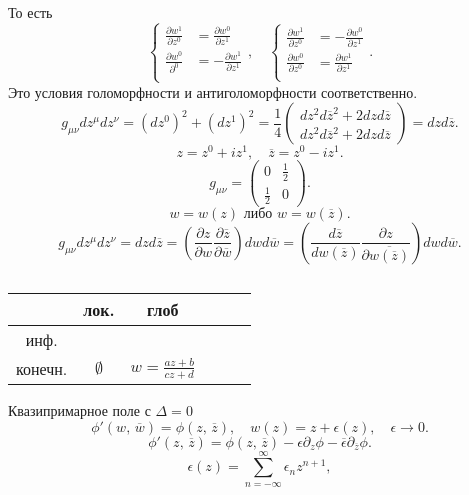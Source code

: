 \documentclass[a4paper]{article}
\begin{document}
То есть
\[
\left\{
\begin{aligned}
\frac{\partial w^1}{\partial z^0} &= \frac{\partial w^0}{\partial z^1}  \\
\frac{\partial w^0}{\partial ^0} &= -\frac{\partial w^1}{\partial z^1}  \\
\end{aligned}
\right.
,\quad
\left\{
\begin{aligned}
\frac{\partial w^1}{\partial z^0} &= - \frac{\partial w^0}{\partial z^1}  \\
\frac{\partial w^0}{\partial z^0}&= \frac{\partial w^1}{\partial z^1}  \\ 
\end{aligned}
\right.
.\] 
Это условия голоморфности и антиголоморфности соответственно.
\[
	g_{\mu \nu} dz^\mu dz^\nu= (dz^0)^2+(dz^1)^2=
	\frac{1}{4} \begin{pmatrix} dz^2 d \overline{z}^2 +2 dz d \overline{z} \\ dz^2 d \overline{z}^2+2 dz d \overline{z} \end{pmatrix} =dz d \overline{z}
.\] 
\[
z=z^0+i z^1,\quad \overline{z}= z^0- i z^1
.\] 
\[
	g_{\mu\nu}=  \begin{pmatrix} 0 & \frac{1}{2}\\ \frac{1}{2} &0 \end{pmatrix} 
.\] 
\[
	w=w(z) \text{ либо } w=w(\overline{z})
.\] 
\[
g_{\mu\nu} dz^\mu dz^\nu= dz d \overline{z} = 
\left( \frac{\partial z}{\partial w} \frac{\partial \overline{z}}{\partial \overline{w}}  \right) dw d \overline{w}=
\left( \frac{d \overline{z}}{dw(\overline{z})} \frac{\partial z}{\partial \overline{w (\overline{z})}} \right) dw d \overline{w}
.\] 
\begin{table}[htpb]
	\centering
	\caption{}
	\label{tab:1}
	\begin{tabular}{|Cc|Cc|Cc|}
		\hline
	 & лок. & глоб \\\hline
		инф. & & \\\hline
		конечн. & $\emptyset$ & $w= \frac{az+b}{cz+d}$ \\\hline
	\end{tabular}
\end{table}
Квазипримарное поле с $\Delta=0$
\[
	\phi'\left(w,\,\overline{w}\right)= \phi \left( z ,\, \overline{z} \right) ,\quad w(z)= z + \epsilon (z),\quad \epsilon\to 0
.\] 
\[
	\phi'\left(z,\,\overline{z}\right)= \phi\left(z,\,\overline{z}\right)- \epsilon \partial_z \phi - \overline{\epsilon } \partial_{\overline{z}} \phi
.\] 
\[
	\epsilon(z)= \sum_{n=-\infty}^{\infty} \epsilon_n z^{n+1},
\]
\end{document}
